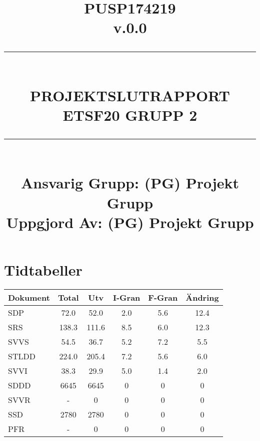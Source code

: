\documentclass[paper=a4, fontsize=11pt,twoside]{article}
\title{
		\documentNumber{#1}																						
		\documentVersion{#2}																				
		\HRule{0.5pt} \\ %
		\LARGE \textbf{\uppercase{#3}} \\
		\large \textbf{\uppercase{ETSF20 Grupp 2}} 
		\HRule{2pt} \\ [1.5cm]    
		\normalsize            
		\documentResponsible{#4} \\ 
		\documentCreator{#4}  
	}
\newcommand{\HRule}[1]{\rule{\linewidth}{#1}}
\newcommand{\documentNumber}[1]{\centering PUSP1742#1 \\[1.0cm]}
\newcommand{\documentVersion}[1]{\centering \small{v.#1} \\[1.0cm]}
\newcommand{\documentResponsible}[1]{\centering  Ansvarig Grupp: #1}
\newcommand{\documentCreator}[1]{\centering Uppgjord Av: #1}
\newcommand{\grouptitlepage}[4]{ 
	\title{
		\documentNumber{#1}																						
		\documentVersion{#2}																				
		\HRule{0.5pt} \\ %
		\LARGE \textbf{\uppercase{#3}} \\
		\large \textbf{\uppercase{ETSF20 Grupp 2}} 
		\HRule{2pt} \\ [1.5cm]    
		\normalsize            
		\documentResponsible{#4} \\ 
		\documentCreator{#4}  
	}																							
	\maketitle																							
	\thispagestyle{empty} 																					
	\newpage 
}
\begin{document}
\grouptitlepage
{19}
{0.0}
{Projektslutrapport}
{(PG) Projekt Grupp}
\tableofcontents

\section{Tidtabeller}
\begin{tabular}{|l|c|c|c|c|c|}
\hline
\textbf{Dokument} & \textbf{Total} & \textbf{Utv} & \textbf{I-Gran} &
\textbf{F-Gran} & \textbf{Ändring}\\
\hline
SDP & 72.0 & 52.0 & 2.0 & 5.6 & 12.4\\
\hline
SRS & 138.3 & 111.6 & 8.5 & 6.0 & 12.3\\
\hline
SVVS & 54.5 & 36.7 & 5.2 & 7.2 & 5.5\\
\hline
STLDD & 224.0 & 205.4 & 7.2 & 5.6 & 6.0\\
\hline
SVVI & 38.3 & 29.9 & 5.0 & 1.4 & 2.0\\
\hline
SDDD & 6645 & 6645 & 0 & 0 & 0\\
\hline
SVVR & - & 0 & 0 & 0 & 0\\
\hline
SSD & 2780 & 2780 & 0 & 0 & 0\\
\hline
PFR & - & 0 & 0 & 0 & 0\\
\hline
\end{tabular}
\end{document}
